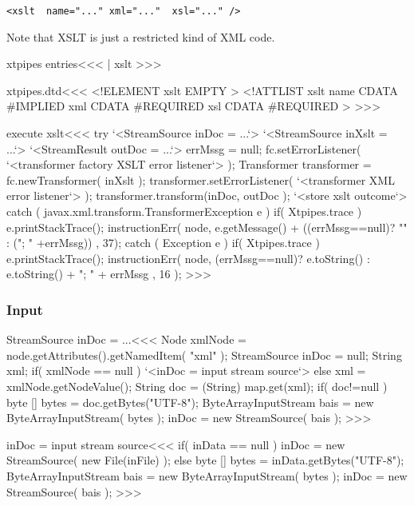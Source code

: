 \documentclass{article}
\begin{document}
{\begin{verbatim}
<xslt  name="..." xml="..."  xsl="..." />
\end{verbatim}

Note that XSLT is just a restricted kind of XML code.



\<xtpipes entries\><<<
| xslt
>>>


\<xtpipes.dtd\><<<
<!ELEMENT xslt EMPTY >
<!ATTLIST xslt
          name CDATA #IMPLIED
          xml  CDATA #REQUIRED
          xsl  CDATA #REQUIRED
>
>>>

\<execute xslt\><<<
try{
   `<StreamSource inDoc = ...`>
   `<StreamSource inXslt = ...`>
   `<StreamResult outDoc = ...`>
   errMssg = null;
   fc.setErrorListener( `<transformer factory XSLT error listener`> );
   Transformer transformer = fc.newTransformer( inXslt );
   transformer.setErrorListener( `<transformer XML error listener`> );
   transformer.transform(inDoc, outDoc );
   `<store xslt outcome`>
} catch ( javax.xml.transform.TransformerException e ){
   if( Xtpipes.trace ){ e.printStackTrace(); }
   instructionErr( node,
                   e.getMessage()
                   +
                   ((errMssg==null)? "" : ("; " +errMssg))
                   , 37);
} catch ( Exception e ){
   if( Xtpipes.trace ){ e.printStackTrace(); }
   instructionErr( node, (errMssg==null)? e.toString()
                                        : e.toString() + "; " + errMssg
                       , 16 );
}
>>>







\subsubsection{Input}

\<StreamSource inDoc = ...\><<<
Node xmlNode = node.getAttributes().getNamedItem( "xml" );
StreamSource inDoc = null;
String xml;
if( xmlNode == null ){
   `<inDoc = input stream source`>
} else {
   xml = xmlNode.getNodeValue();
   String doc = (String) map.get(xml);
   if( doc!=null ){
      byte [] bytes = doc.getBytes("UTF-8");
      ByteArrayInputStream bais = new ByteArrayInputStream( bytes );
      inDoc = new StreamSource( bais );
}  }
>>>




\<inDoc = input stream source\><<<
if( inData == null ){
   inDoc = new StreamSource( new File(inFile) );
} else {
   byte [] bytes = inData.getBytes("UTF-8");
   ByteArrayInputStream bais = new ByteArrayInputStream( bytes );
   inDoc = new StreamSource( bais );
}
>>>



}
\end{document}
